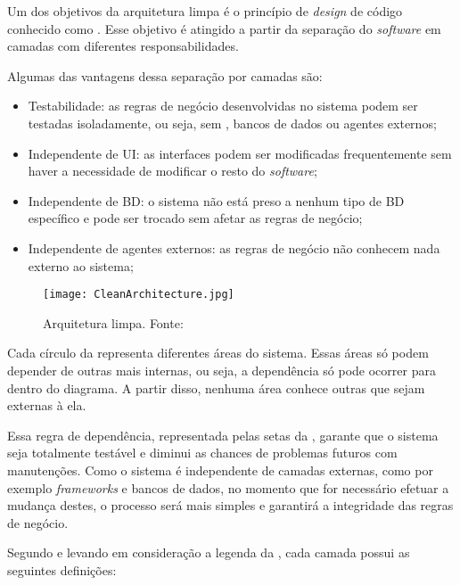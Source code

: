 Um dos objetivos da arquitetura limpa é o princípio de \textit{design} de código conhecido como . Esse objetivo é atingido a partir da separação do \textit{software} em camadas com diferentes responsabilidades.

Algumas das vantagens dessa separação por camadas são:

\begin{itemize}
    \item Testabilidade: as regras de negócio desenvolvidas no sistema podem ser testadas isoladamente, ou seja, sem  , bancos de dados ou agentes externos;
    \item Independente de UI: as interfaces podem ser modificadas frequentemente sem haver a necessidade de modificar o resto do \textit{software};
    \item Independente de BD: o sistema não está preso a nenhum tipo de BD específico e pode ser trocado sem afetar as regras de negócio;
    \item Independente de agentes externos: as regras de negócio não conhecem nada externo ao sistema;
\end{itemize}

\begin{figure}[!htb]
    \centering
    \texttt{[image: CleanArchitecture.jpg]}
    \caption[Arquitetura limpa]{Arquitetura limpa. Fonte: \cite{clean}}
    \label{fig:clean1}
\end{figure}

Cada círculo da  representa diferentes áreas do sistema. Essas áreas só podem depender de outras mais internas, ou seja, a dependência só pode ocorrer para dentro do diagrama. A partir disso, nenhuma área conhece outras que sejam externas à ela. 

Essa regra de dependência, representada pelas setas da ,   garante que o sistema seja totalmente testável e diminui as chances de problemas futuros com manutenções. Como o sistema é independente de camadas externas, como por exemplo \textit{frameworks} e bancos de dados, no momento que for necessário efetuar a mudança destes, o processo será mais simples e garantirá a integridade das regras de negócio.

Segundo \textcite{clean} e levando em consideração a legenda da , cada camada possui as seguintes definições:

